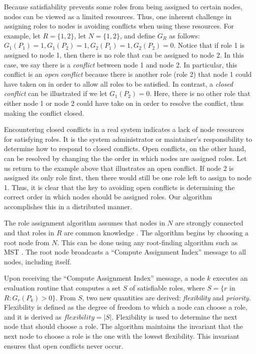 \documentclass[11pt]{article}
\begin{document}
\begin{multicols}{2}
Because satisfiability prevents some roles from being assigned to certain nodes, nodes can be viewed as a limited resources. Thus, one inherent challenge in assigning roles to nodes is avoiding conflicts when using these resources. For example, let $R = \{1, 2\}$, let $N = \{1, 2\}$, and define $G_{R}$ as follows: $G_{1}(P_{1}) = 1, G_{1}(P_{2}) = 1, G_{2}(P_{1}) = 1, G_{2}(P_{2}) = 0$. Notice that if role 1 is assigned to node 1, then there is no role that can be assigned to node 2. In this case, we say there is a \textit{conflict} between node 1 and node 2. In particular, this conflict is an \textit{open conflict} because there is another role (role 2) that node 1 could have taken on in order to allow all roles to be satisfied. In contrast, a \textit{closed conflict} can be illustrated if we let $G_{1}(P_{2}) = 0$. Here, there is no other role that either node 1 or node 2 could have take on in order to resolve the conflict, thus making the conflict closed.

Encountering closed conflicts in a real system indicates a lack of node resources for satisfying roles. It is the system administrator or maintainer's responsibility to determine how to respond to closed conflicts. Open conflicts, on the other hand, can be resolved by changing the the order in which nodes are assigned roles. Let us return to the example above that illustrates an open conflict. If node 2 is assigned its only role first, then there would still be one role left to assign to node 1. Thus, it is clear that the key to avoiding open conflicts is determining the correct order in which nodes should be assigned roles. Our algorithm accomplishes this in a distributed manner.

The role assignment algorithm assumes that nodes in $N$ are strongly connected and that roles in $R$ are common knowledge \cite{garg}. The algorithm begins by choosing a root node from $N$. This can be done using any root-finding algorithm such as MST \cite{MST}. The root node broadcasts a ``Compute Assignment Index'' message to all nodes, including itself.

Upon receiving the ``Compute Assignment Index'' message, a node $k$ executes an evaluation routine that computes a set $S$ of satisfiable roles, where $S = \{r$ in $R : G_{r}(P_{k}) > 0\}$. From $S$, two new quantities are derived: \textit{flexibility} and \textit{priority}. Flexibility is defined as the degree of freedom to which a node can choose a role, and it is derived as $flexibility = |S|$. Flexibility is used to determine the next node that should choose a role. The algorithm maintains the invariant that the next node to choose a role is the one with the lowest flexibility. This invariant ensures that open conflicts never occur.


\end{multicols}
\end{document}
